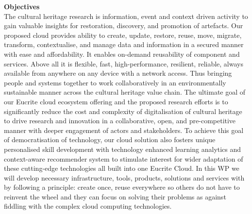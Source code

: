 \textbf{Objectives}\\
The cultural heritage research is information, event and context driven activity to gain valuable insights for restoration, discovery, and promotion of artefacts. Our proposed cloud provides ability to create, update, restore, reuse, move, migrate, transform, contextualise, and manage data and information in a secured manner with ease and affordability. It enables on-demand reusability of component and services. Above all it is flexible, fast, high-performance, resilient, reliable, always available from anywhere on any device with a network access. Thus bringing people and systems together to work collaboratively in an environmentally sustainable manner across the cultural heritage value chain. The ultimate goal of our Eucrite cloud ecosystem offering and the proposed research efforts is to significantly reduce the cost and complexity of digitalisation of cultural heritage to drive research and innovation in a collaborative, open, and pre-competitive manner with deeper engagement of actors and stakeholders. To achieve this goal of democratisation of technology, our cloud solution also fosters unique personalised skill development with technology enhanced learning analytics and context-aware recommender system to stimulate interest for wider adaptation of these cutting-edge technologies all built into one Eucrite Cloud. In this WP we will develop necessary infrastructure, tools, products, solutions and services with by following a principle: create once, reuse everywhere so others do not have to reinvent the wheel and they can focus on solving their problems as against fiddling with the complex cloud computing technologies. 
\par

